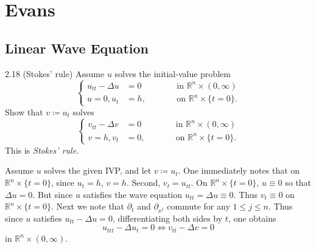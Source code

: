 \documentclass{article}
\begin{document}
\newpage 

\section{Evans} 
\subsection{Linear Wave Equation}
\begin{prb}{2.18}
	(Stokes' rule) Assume $u$ solves the initial-value problem 
	\begin{equation*}
		\left\{
		\begin{alignedat}{3}
			u_{tt} - \Delta u &= 0 &\qquad& \text{in $\mathbb{R}^{n} \times (0, \infty)$} \\
			u =0, u_{t} &= h, &\qquad& \text{on $\mathbb{R}^{n} \times \{t = 0\}$}. 
		\end{alignedat}
		\right.
	\end{equation*}
	Show that $v \coloneqq u_{t}$ solves 
	\begin{equation*}
		\left\{
		\begin{alignedat}{3}
			v_{tt} - \Delta v &= 0 &\qquad& \text{in $\mathbb{R}^{n} \times (0, \infty)$} \\
			v =h, v_{t} &= 0, &\qquad& \text{on $\mathbb{R}^{n} \times \{t = 0\}$}. 
		\end{alignedat}
		\right.
	\end{equation*}
	This is \textit{Stokes' rule.}
\end{prb}
Assume $u$ solves the given IVP, and let $v \coloneqq u_{t}$. One immediately notes that on $\mathbb{R}^{n} \times \{t = 0\}$, since $u_{t} = h$, $v = h$. Second, $v_{t} = u_{tt}$. On $\mathbb{R}^{n} \times \{t = 0\}$, $u \equiv 0$ so that $\Delta u = 0$. But since $u$ satisfies the wave equation $u_{tt} = \Delta u \equiv 0$. Thus $v_{t} \equiv 0$ on $\mathbb{R}^{n} \times \{t = 0\}$. Next we note that $\partial_{t}$ and $\partial_{x^{j}}$ commute for any $1 \leq j \leq n$. Thus since $u$ satisfies $u_{tt} - \Delta u = 0$, differentiating both sides by $t$, one obtains 
\begin{equation*}
	u_{ttt} - \Delta u_{t} = 0 \iff v_{tt} - \Delta v = 0 
\end{equation*}
in $\mathbb{R}^{n} \times (0,\infty)$. 
\end{document}
